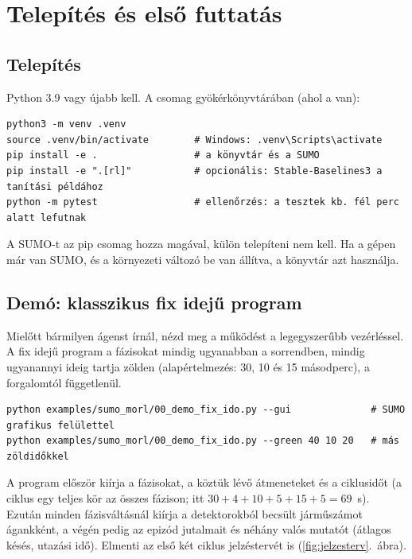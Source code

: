 \documentclass[11pt,a4paper]{article}
\begin{document}
\section{Telepítés és első futtatás}

\subsection{Telepítés}

Python 3.9 vagy újabb kell. A csomag gyökérkönyvtárában (ahol a  van):

\begin{lstlisting}[style=bash]
python3 -m venv .venv
source .venv/bin/activate        # Windows: .venv\Scripts\activate
pip install -e .                 # a könyvtár és a SUMO
pip install -e ".[rl]"           # opcionális: Stable-Baselines3 a tanítási példához
python -m pytest                 # ellenőrzés: a tesztek kb. fél perc alatt lefutnak
\end{lstlisting}

A SUMO-t az  pip csomag hozza magával, külön telepíteni nem kell. Ha a gépen már van
SUMO, és a  környezeti változó be van állítva, a könyvtár azt használja.

\subsection{Demó: klasszikus fix idejű program}

Mielőtt bármilyen ágenst írnál, nézd meg a működést a legegyszerűbb vezérléssel. A fix idejű
program a fázisokat mindig ugyanabban a sorrendben, mindig ugyanannyi ideig tartja zölden
(alapértelmezés: 30, 10 és 15 másodperc), a forgalomtól függetlenül.

\begin{lstlisting}[style=bash]
python examples/sumo_morl/00_demo_fix_ido.py --gui              # SUMO grafikus felülettel
python examples/sumo_morl/00_demo_fix_ido.py --green 40 10 20   # más zöldidőkkel
\end{lstlisting}

A program először kiírja a fázisokat, a köztük lévő átmeneteket és a ciklusidőt (a ciklus egy teljes
kör az összes fázison; itt $30+4+10+5+15+5 = 69$~s). Ezután minden fázisváltásnál kiírja a
detektorokból becsült járműszámot ágankként, a végén pedig az epizód jutalmait és néhány valós
mutatót (átlagos késés, utazási idő). Elmenti az első két ciklus jelzéstervét is
(\ref{fig:jelzesterv}.~ábra).
\end{document}
